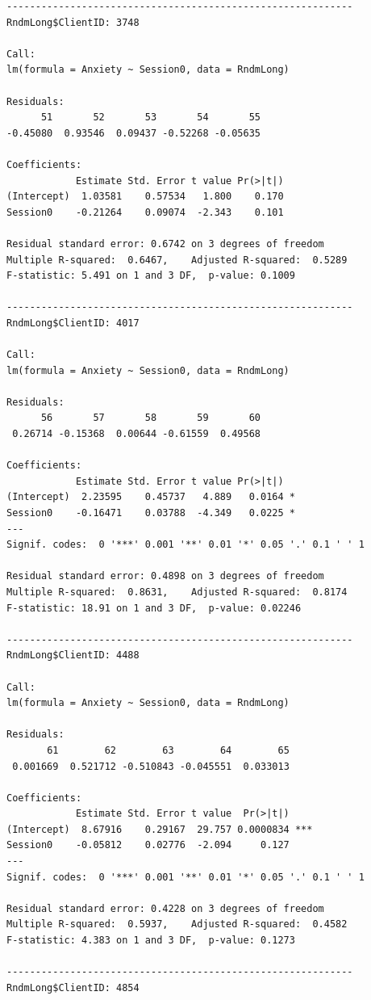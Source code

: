 \documentclass[
  11pt,
]{book}
\begin{document}
\begin{verbatim}
------------------------------------------------------------ 
RndmLong$ClientID: 3748

Call:
lm(formula = Anxiety ~ Session0, data = RndmLong)

Residuals:
      51       52       53       54       55 
-0.45080  0.93546  0.09437 -0.52268 -0.05635 

Coefficients:
            Estimate Std. Error t value Pr(>|t|)
(Intercept)  1.03581    0.57534   1.800    0.170
Session0    -0.21264    0.09074  -2.343    0.101

Residual standard error: 0.6742 on 3 degrees of freedom
Multiple R-squared:  0.6467,    Adjusted R-squared:  0.5289 
F-statistic: 5.491 on 1 and 3 DF,  p-value: 0.1009

------------------------------------------------------------ 
RndmLong$ClientID: 4017

Call:
lm(formula = Anxiety ~ Session0, data = RndmLong)

Residuals:
      56       57       58       59       60 
 0.26714 -0.15368  0.00644 -0.61559  0.49568 

Coefficients:
            Estimate Std. Error t value Pr(>|t|)  
(Intercept)  2.23595    0.45737   4.889   0.0164 *
Session0    -0.16471    0.03788  -4.349   0.0225 *
---
Signif. codes:  0 '***' 0.001 '**' 0.01 '*' 0.05 '.' 0.1 ' ' 1

Residual standard error: 0.4898 on 3 degrees of freedom
Multiple R-squared:  0.8631,    Adjusted R-squared:  0.8174 
F-statistic: 18.91 on 1 and 3 DF,  p-value: 0.02246

------------------------------------------------------------ 
RndmLong$ClientID: 4488

Call:
lm(formula = Anxiety ~ Session0, data = RndmLong)

Residuals:
       61        62        63        64        65 
 0.001669  0.521712 -0.510843 -0.045551  0.033013 

Coefficients:
            Estimate Std. Error t value  Pr(>|t|)    
(Intercept)  8.67916    0.29167  29.757 0.0000834 ***
Session0    -0.05812    0.02776  -2.094     0.127    
---
Signif. codes:  0 '***' 0.001 '**' 0.01 '*' 0.05 '.' 0.1 ' ' 1

Residual standard error: 0.4228 on 3 degrees of freedom
Multiple R-squared:  0.5937,    Adjusted R-squared:  0.4582 
F-statistic: 4.383 on 1 and 3 DF,  p-value: 0.1273

------------------------------------------------------------ 
RndmLong$ClientID: 4854


\end{verbatim}
\end{document}
